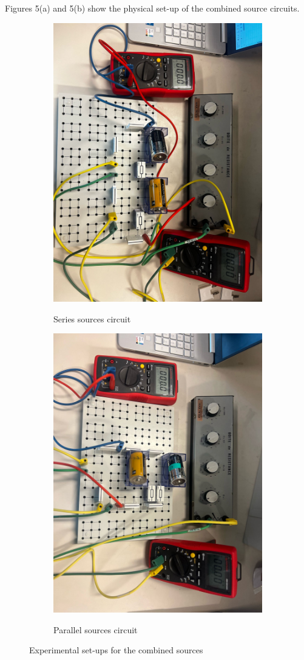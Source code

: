 \documentclass[a4paper]{article}
\begin{document}
Figures 5(a) and 5(b) show the physical set-up of the combined source circuits.

\begin{figure}[!ht]
    \centering
    \begin{subfigure}{0.5\textwidth}
        \centering
        \includegraphics[width = 0.6\linewidth, angle = 90]{series.jpeg}
        \label{fig:5a}
        \caption{Series sources circuit}
    \end{subfigure}%
    \begin{subfigure}{0.5\textwidth}
        \centering
        \includegraphics[width = 0.6\linewidth, angle = 90]{parallel.jpeg}
        \label{fig:5b}
        \caption{Parallel sources circuit}
    \end{subfigure}
    \label{fig:5}
    \caption{Experimental set-ups for the combined sources}
\end{figure}
\end{document}
